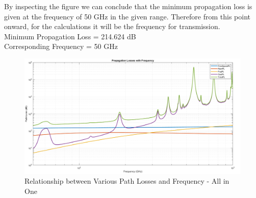 \documentclass[a4paper,11pt]{article}%
\begin{document}
By inspecting the figure we can conclude that the minimum propagation loss is given at the frequency of 50 GHz in the given range. Therefore from this point onward, for the calculations it will be the frequency for transmission.\\

Minimum Propagation Loss = 214.624 dB\\
Corresponding Frequency = 50 GHz\\



\begin{figure}[!h]
	\centering
	\includegraphics[scale=0.35]{figures/AllinOne.png}
	\caption{Relationship between Various Path Losses and Frequency - All in One}
\end{figure}
%
%
%
\end{document}
